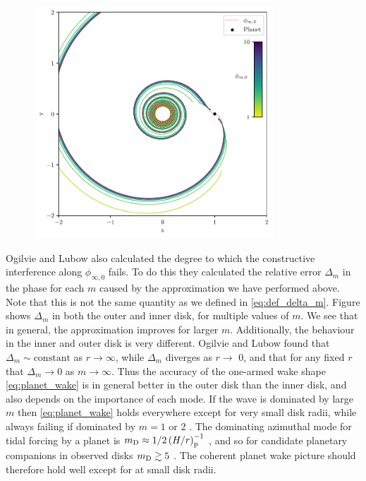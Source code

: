 \begin{figure}
    \centering
    \includegraphics[width = 0.8\textwidth]{figures/planet_wake_shape.pdf}
    \caption{}
    \label{fig:planet_wake}
\end{figure}

Ogilvie and Lubow also calculated the degree to which the constructive interference along $\phi_{\infty,0}$ fails.
To do this they calculated the relative error $\Delta_m$ in the phase for each $m$ caused by the approximation we have performed above.
Note that this is not the same quantity as we defined in \ref{eq:def_delta_m}.
Figure  shows $\Delta_m$ in both the outer and inner disk, for multiple values of $m$.
We see that in general, the approximation improves for larger $m$.
Additionally, the behaviour in the inner and outer disk is very different.
Ogilvie and Lubow found that $\Delta_m \sim \mathrm{constant}$ as $r \rightarrow \infty$, while $\Delta_m$ diverges as $r \rightarrow$ 0, and that for any fixed $r$ that $\Delta_m \rightarrow 0$ as $m \rightarrow \infty$.
Thus the accuracy of the one-armed wake shape \ref{eq:planet_wake} is in general better in the outer disk than the inner disk, and also depends on the importance of each mode.
If the wave is dominated by large $m$ then \ref{eq:planet_wake} holds everywhere except for very small disk radii, while always failing if dominated by $m=1$ or $2$ \citep{ogilvie2002}.
The dominating azimuthal mode for tidal forcing by a planet is $m_{\rm D} \approx 1/2 \left( H/r \right)_{\rm p}^{-1}$ \citep{goldreich1980}, and so for candidate planetary companions in observed disks $m_{\rm D} \gtrsim 5$ \fct. 
The coherent planet wake picture should therefore hold well except for at small disk radii.


